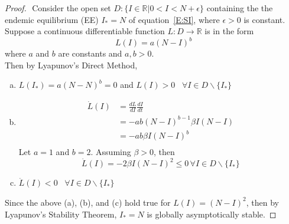 \begin{proof} $ $\newline
    Consider the open set $D: \{I \in \mathbb{R}| 0 < I < N+ \epsilon \}$ containing the the endemic equilibrium (EE) $I_* = N$ of equation~\eqref{E:SI}, where $\epsilon > 0$ is constant.
    Suppose a continuous differentiable function $L:D\rightarrow \mathbb{R}$  is in the form
    \begin{equation}
        L(I) = a(N-I)^b
    \end{equation}
    where $a$ and $b$ are constants and $a, b > 0$.\\
    Then by Lyapunov's Direct Method,
    \begin{enumerate}[(a)]
        \item $L(I_*) = a(N-N)^b = 0$ and $L(I)>0$ \, $\forall I\in D\backslash \{I_*\}$
        \item
        \begin{align*}
            \dot{L}(I)  &= \frac{dL}{dI} \frac{dI}{dt} \\
            &= -ab(N-I)^{b-1}\beta I(N-I)\\
            &= -ab\beta I(N-I)^b\\
        \end{align*}
        Let $a = 1$ and $b = 2$. Assuming $\beta>0$, then
        $$\dot{L}(I) = -2\beta I(N-I)^2 \leq 0 \, \forall I \in D \backslash \{I_*\}$$
        \item $\dot{L}(I) < 0$ \, $\forall I\in D\backslash \{I_*\}$
    \end{enumerate}
    Since the above (a), (b), and (c) hold true for $L(I) = (N-I)^2$, then by Lyapunov's Stability Theorem, $I_* = N$ is globally asymptotically stable.
\end{proof}
